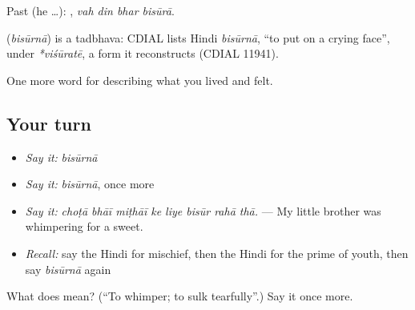 Past (he …):    , \emph{vah din bhar bisūrā}.

\begin{cousinweb}
\textbf{} (\emph{bisūrnā}) is a tadbhava: CDIAL lists Hindi \emph{bisūrnā}, \textquotedblleft{}to put on a crying face\textquotedblright{}, under \emph{*viśūratē}, a form it reconstructs (CDIAL 11941).
\end{cousinweb}

\begin{grammarlens}[title={What you've built}]
One more word for describing what you lived and felt.
\end{grammarlens}

\subsection*{Your turn}
\begin{itemize}
\raggedright
  \item \emph{Say it:} \emph{bisūrnā}
  \item \emph{Say it:} \emph{bisūrnā}, once more
  \item \emph{Say it:} \emph{choṭā bhāī miṭhāī ke liye bisūr rahā thā.} — My little brother was whimpering for a sweet.
  \item \emph{Recall:} say the Hindi for mischief, then the Hindi for the prime of youth, then say \emph{bisūrnā} again
\end{itemize}

\begin{tcolorbox}[breakable,colback=teal!4,colframe=teal!35!black,title={Before you move on}]
What does  mean? (\textquotedblleft{}To whimper; to sulk tearfully\textquotedblright{}.) Say it once more.
\end{tcolorbox}
